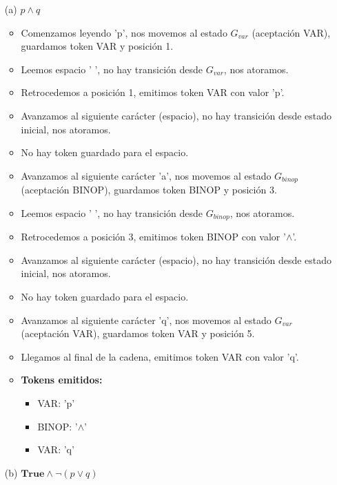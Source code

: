 \begin{enumerate}
    \item[(a)] $p \land q$
    
    \begin{itemize}
        \item Comenzamos leyendo 'p', nos movemos al estado $G_{var}$ (aceptación VAR), guardamos token VAR y posición 1.
        \item Leemos espacio ' ', no hay transición desde $G_{var}$, nos atoramos.
        \item Retrocedemos a posición 1, emitimos token VAR con valor 'p'.
        \item Avanzamos al siguiente carácter (espacio), no hay transición desde estado inicial, nos atoramos.
        \item No hay token guardado para el espacio.
        \item Avanzamos al siguiente carácter 'a', nos movemos al estado $G_{binop}$ (aceptación BINOP), guardamos token BINOP y posición 3.
        \item Leemos espacio ' ', no hay transición desde $G_{binop}$, nos atoramos.
        \item Retrocedemos a posición 3, emitimos token BINOP con valor '$\land$'.
        \item Avanzamos al siguiente carácter (espacio), no hay transición desde estado inicial, nos atoramos.
        \item No hay token guardado para el espacio.
        \item Avanzamos al siguiente carácter 'q', nos movemos al estado $G_{var}$ (aceptación VAR), guardamos token VAR y posición 5.
        \item Llegamos al final de la cadena, emitimos token VAR con valor 'q'.
    \item \textbf{Tokens emitidos:}
        \begin{itemize}
            \item VAR: 'p'
            \item BINOP: '$\land$'
            \item VAR: 'q'
        \end{itemize}
    \end{itemize}


    \item[(b)] $\textbf{True} \land \lnot(p \lor q)$
    

\end{enumerate}
